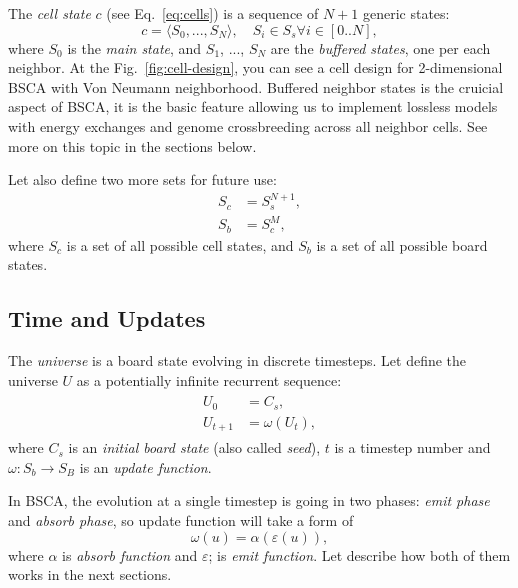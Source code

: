 \documentclass[a4paper,12pt,tikz,UTF8]{article}
\begin{document}
    The \textit{cell state} $c$ (see Eq.~\ref{eq:cells}) is a sequence of $N + 1$ generic states:
    \begin{equation}
      \label{eq:cell-state}
      c = \langle S_0, ..., S_N \rangle, \quad S_i \in S_s \forall i \in {[0 .. N]},
    \end{equation}
    where $S_0$ is the \textit{main state}, and $S_1$, ..., $S_N$ are the \textit{buffered states}, one per each neighbor. At the Fig.~\ref{fig:cell-design}, you can see a cell design for 2-dimensional BSCA with Von Neumann neighborhood. Buffered neighbor states is the cruicial aspect of BSCA, it is the basic feature allowing us to implement lossless models with energy exchanges and genome crossbreeding across all neighbor cells. See more on this topic in the sections below.

    Let also define two more sets for future use:
    \begin{align}
      S_c &= S_s^{N + 1},\\
      S_b &= S_c^M,
    \end{align}
    where $S_c$ is a set of all possible cell states, and $S_b$ is a set of all possible board states.

  \subsection{Time and Updates}

    The \textit{universe} is a board state evolving in discrete timesteps. Let define the universe $U$ as a potentially infinite recurrent sequence:
    \begin{align}
      \begin{split}
        U_0 &= C_s,\\
        U_{t + 1} &= \omega(U_t),
      \end{split}
    \end{align}
    where $C_s$ is an \textit{initial board state} (also called \textit{seed}), $t$ is a timestep number and $\omega: S_b \to S_B$ is an \textit{update function}.

    In BSCA, the evolution at a single timestep is going in two phases: \textit{emit phase} and \textit{absorb phase}, so update function will take a form of
    \begin{equation}
      \omega(u) = \alpha(\varepsilon(u)),
    \end{equation}
    where $\alpha$ is \textit{absorb function} and $\varepsilon$; is \textit{emit function}. Let describe how both of them works in the next sections.
\end{document}

